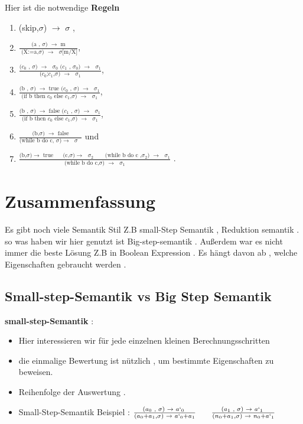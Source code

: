 \documentclass[a4paper,12pt,twoside,headsepline]{scrartcl}
\begin{document}
 Hier ist die notwendige \textbf{Regeln}
\begin{enumerate}
	\item (skip,$\sigma$) $\to$ $\sigma$ ,
	\item $\frac  {\text {(a , $\sigma$) $\to$ m} } { \text{ (X:=a,$\sigma$) $\to$ $\sigma$[m/X]} }$,
	\item  $\frac  {\text {($c_0$ , $\sigma$) $\to$ $\sigma_0$   ($c_1$ , $\sigma_0$) $\to$ $\sigma_1$} } { \text{($c_0$;$c_1$,$\sigma$) $\to$ $\sigma_1$} }$,
	\item $\frac  {\text {(b , $\sigma$) $\to$ true   ($c_0$ , $\sigma$) $\to$ $\sigma_1$} } { \text{(if b then $c_0$ else $c_1$,$\sigma$) $\to$ $\sigma_1$} }$,
	\item $\frac  {\text {(b , $\sigma$) $\to$ false   ($c_1$ , $\sigma$) $\to$ $\sigma_1$} } { \text{(if b then $c_0$ else $c_1$,$\sigma$) $\to$ $\sigma_1$} }$,
	\item $\frac {\text{(b,$\sigma$) $\to$ false}} {\text{(while b do c, $\sigma$)$\to$ $\sigma$ }}$ und
	\item $\frac {\text{(b,$\sigma$)$\to$ true $\quad$ (c,$\sigma$)$\to$ $\sigma_2$  $\quad$ (while b do c ,$\sigma_2$) $\to$ $\sigma_1$}}{\text{(while b do c,$\sigma$) $\to$ $\sigma_1$}}$  . 
	              
      \end{enumerate}
  
  \section{Zusammenfassung}
  Es gibt noch viele Semantik Stil Z.B small-Step Semantik , Reduktion semantik .
  so was haben wir hier genutzt ist Big-step-semantik . Außerdem war es nicht immer die beste Lösung Z.B in Boolean Expression . Es hängt davon ab , welche Eigenschaften  gebraucht werden . 
  
  \subsection{Small-step-Semantik vs Big Step Semantik }  
  \textbf{small-step-Semantik} :
  \begin{itemize}
  	\item Hier interessieren wir für jede einzelnen kleinen Berechnungsschritten
  	\item  die einmalige Bewertung ist nützlich , um bestimmte Eigenschaften zu beweisen.
  	\item Reihenfolge der Auswertung .
  	\item Small-Step-Semantik Beispiel :  $\frac  {\text {($a_0$ , $\sigma$) $\to$ $a`_0$ } } { \text{($a_0$+$a_1$,$\sigma$) $\to$ $a`_0$+$a_1$} }$ $\quad$  $\frac  {\text {($a_1$ , $\sigma$) $\to$ $a`_1$ } } { \text{($n_0$+$a_1$,$\sigma$) $\to$ $n_0$+$a`_1$} }$
  \end{itemize}
  
\end{document}
